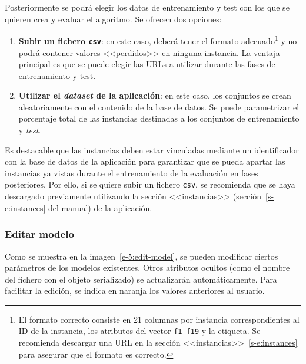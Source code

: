 Posteriormente se podrá elegir los datos de entrenamiento y test con los que se quieren crea y evaluar el algoritmo. Se ofrecen dos opciones:

\begin{enumerate}
	\item \textbf{Subir un fichero \texttt{csv}}: en este caso, deberá tener el formato adecuado\footnote{El formato correcto consiste en 21 columnas por instancia correspondientes al ID de la instancia, los atributos del vector \texttt{f1-f19} y la etiqueta. Se recomienda descargar una URL en la sección <<instancias>>~\ref{s-e:instances} para asegurar que el formato es correcto.} y no podrá contener valores <<perdidos>> en ninguna instancia. La ventaja principal es que se puede elegir las URLs a utilizar durante las fases de entrenamiento y test.
	\item \textbf{Utilizar el \textit{dataset} de la aplicación}: en este caso, los conjuntos se crean aleatoriamente con el contenido de la base de datos. Se puede parametrizar el porcentaje total de las instancias destinadas a los conjuntos de entrenamiento y \textit{test}.
\end{enumerate}

Es destacable que las instancias deben estar vinculadas mediante un identificador con la base de datos de la aplicación para garantizar que se pueda apartar las instancias ya vistas durante el entrenamiento de la evaluación en fases posteriores. Por ello, si se quiere subir un fichero \texttt{csv}, se recomienda que se haya descargado previamente utilizando la sección <<instancias>> (sección~\ref{s-e:instances} del manual) de la aplicación.

\subsubsection{Editar modelo}

Como se muestra en la imagen~\ref{e-5:edit-model}, se pueden modificar ciertos parámetros de los modelos existentes. Otros atributos ocultos (como el nombre del fichero con el objeto serializado) se actualizarán automáticamente. Para facilitar la edición, se indica en naranja los valores anteriores al usuario.

